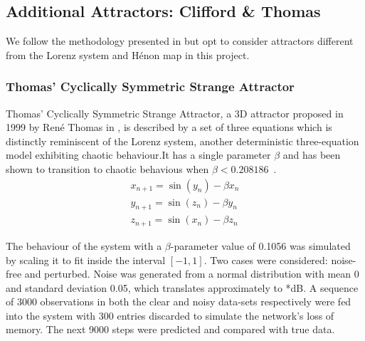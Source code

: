 \documentclass[a4paper,12pt,twoside]{report}
\begin{document}
\subsection{Additional Attractors: Clifford \& Thomas}
We follow the methodology presented in \cite{manjunath2021universal} but opt to consider attractors different from the Lorenz system and H\'enon map in this project.

\subsubsection{Thomas' Cyclically Symmetric Strange Attractor}\label{Thomas_Attractor}
Thomas' Cyclically Symmetric Strange Attractor, a 3D attractor proposed in 1999 by Ren\'e Thomas in \cite{ThomasAttractor}, is described by a set of three equations which is distinctly reminiscent of the Lorenz system, another deterministic three-equation model exhibiting chaotic behaviour.It has a single parameter $\beta$ and has been shown to transition to chaotic behavious when $\beta<0.208186$~\cite{Thomas_BetaParameter}.
\begin{eqnarray}\label{eqns_thomas}
  x_{n+1} = \sin(y_n) - \beta{x_n} \\
  y_{n+1} = \sin(z_n) - \beta{y_n} \\
  z_{n+1} = \sin(x_n) - \beta{z_n}
\end{eqnarray}

The behaviour of the system with a $\beta$-parameter value of 0.1056 was simulated by scaling it to fit inside the interval $[-1,1]$. Two cases were considered: noise-free and perturbed. Noise was generated from a normal distribution with mean 0 and standard deviation 0.05, which translates approximately to *dB.
 A sequence of 3000 observations in both the clear and noisy data-sets respectively were fed into the system with 300 entries discarded to simulate the network's loss of memory. The next 9000 steps were predicted and compared with true data.
\end{document}
